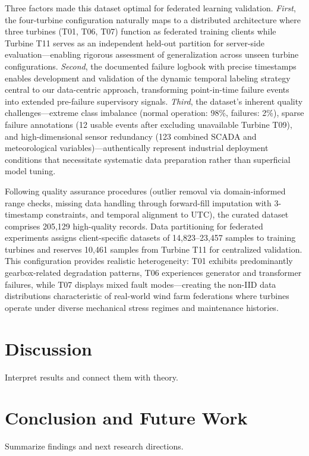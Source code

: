 \documentclass[12pt]{article}
\begin{document}
Three factors made this dataset optimal for federated learning validation. \textit{First}, the four-turbine configuration naturally maps to a distributed architecture where three turbines (T01, T06, T07) function as federated training clients while Turbine T11 serves as an independent held-out partition for server-side evaluation—enabling rigorous assessment of generalization across unseen turbine configurations. \textit{Second}, the documented failure logbook with precise timestamps enables development and validation of the dynamic temporal labeling strategy central to our data-centric approach, transforming point-in-time failure events into extended pre-failure supervisory signals. \textit{Third}, the dataset's inherent quality challenges—extreme class imbalance (normal operation: 98\%, failures: 2\%), sparse failure annotations (12 usable events after excluding unavailable Turbine T09), and high-dimensional sensor redundancy (123 combined SCADA and meteorological variables)—authentically represent industrial deployment conditions that necessitate systematic data preparation rather than superficial model tuning.

Following quality assurance procedures (outlier removal via domain-informed range checks, missing data handling through forward-fill imputation with 3-timestamp constraints, and temporal alignment to UTC), the curated dataset comprises 205,129 high-quality records. Data partitioning for federated experiments assigns client-specific datasets of 14,823--23,457 samples to training turbines and reserves 10,461 samples from Turbine T11 for centralized validation. This configuration provides realistic heterogeneity: T01 exhibits predominantly gearbox-related degradation patterns, T06 experiences generator and transformer failures, while T07 displays mixed fault modes—creating the non-IID data distributions characteristic of real-world wind farm federations where turbines operate under diverse mechanical stress regimes and maintenance histories.


\section{Discussion}
Interpret results and connect them with theory.

\section{Conclusion and Future Work}
Summarize findings and next research directions.



\end{document}
